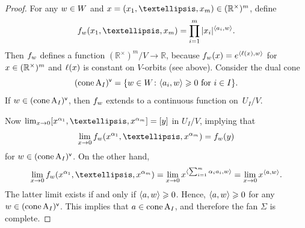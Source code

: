 \documentclass[10pt,a4paper]{amsart}
\def\R{\mathbb R}
\def\cone{\mathop{\mathrm{cone}}}
\newcommand{\mb}[1]{{\textbf {\textit#1}}}
\renewcommand{\ge}{\geqslant}
\begin{document}
\begin{proof}
For any $\mb w\in W$ and $\mb x= (x_1,\ldots,x_m)\in (\R^\times)^m$, define
\[
  f_{\mb w}(x_1,\ldots,x_m)=\prod_{i=1}^m|x_i|^{\langle\mb a_i,\mb w\rangle}.
\]
Then $f_{\mb w}$ defines a function $(\R^\times)^m/V\to\R$, because $f_{\mb w}(\mb x)=e^{\langle\ell(\mb x),\mb w\rangle}$ for $\mb x\in(\R^\times)^m$ and $\ell(\mb x)$ is constant on $V$-orbits (see above). Consider the dual cone
\[
  (\cone \mathrm A_I)^\mathsf{v}=
  \{\mb w\in W\colon\langle\mb a_i,\mb w\rangle\ge 0\text{ for }i\in I\}.
\]
If $\mb w\in(\cone \mathrm A_I)^\mathsf{v}$, then $f_{\mb w}$ extends to a continuous  function on~$U_I/V$.

Now $\lim_{x\to0}[x^{\alpha_1},\ldots,x^{\alpha_m}]=[\mb y]$ in $U_I/V$, implying that 
\[
  \lim_{x\to0}f_{\mb w}(x^{\alpha_1},\ldots,x^{\alpha_m})=f_{\mb w}(\mb y)
\]  
 for $\mb w\in(\cone \mathrm A_I)^\mathsf{v}$. On the other hand,
\[
  \lim_{x\to0}f_{\mb w}(x^{\alpha_1},\ldots,x^{\alpha_m})  
  =\lim_{x\to 0} x^{\langle\sum_{i=1}^m\alpha_i\mb a_i,\mb w\rangle}
  =\lim_{x\to 0} x^{\langle\mb a,\mb w\rangle}.
\]
The latter limit exists if and only if $\langle\mb a,\mb w\rangle\ge0$. Hence, $\langle\mb a,\mb w\rangle\ge0$ for any $\mb w\in(\cone \mathrm A_I)^\mathsf{v}$. This implies  that $\mb a\in\cone \mathrm A_I$, and therefore the fan $\Sigma$ is complete.
\end{proof}
\end{document}
